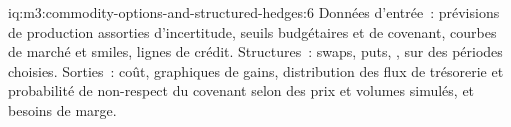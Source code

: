 \begin{solution}{iq:m3:commodity-options-and-structured-hedges:6}
Données d'entrée~: prévisions de production assorties d'incertitude, seuils budgétaires et de covenant, courbes de marché et smiles,
lignes de crédit. Structures~: swaps, puts, ,  sur des périodes choisies. Sorties~: coût, graphiques de
gains, distribution des flux de trésorerie et probabilité de non-respect du covenant selon des prix et volumes simulés, et
besoins de marge.
\end{solution}
